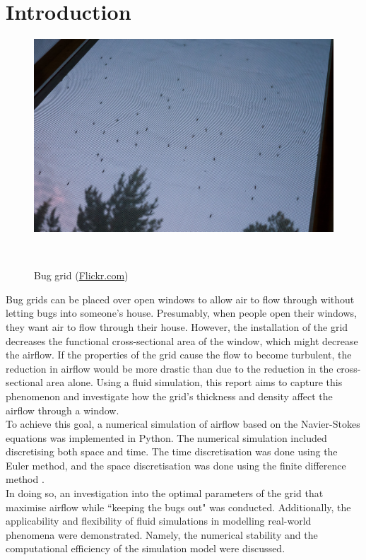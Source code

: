 \section{Introduction} \label{section: intro and motiv}

\begin{figure}
\vspace{-1.5cm}
\includegraphics[width=0.9\linewidth]{figures/mosquitogrid.jpg}
\caption{Bug grid (\href{https://www.flickr.com/photos/neekohfi/7817306994/}{Flickr.com})}\
\end{figure}

Bug grids can be placed over open windows to allow air to flow through without letting bugs into someone's house. Presumably, when people open their windows, they want air to flow through their house. However, the installation of the grid decreases the functional cross-sectional area of the window, which might decrease the airflow. If the properties of the grid cause the flow to become turbulent, the reduction in airflow would be more drastic than due to the reduction in the cross-sectional area alone. Using a fluid simulation, this report aims to capture this phenomenon and investigate how the grid's thickness and density affect the airflow through a window. \\

To achieve this goal, a numerical simulation of airflow based on the Navier-Stokes equations was implemented in Python. The numerical simulation included discretising both space and time. The time discretisation was done using the Euler method, and the space discretisation was done using the finite difference method \cite{landau2015computational}. \\ 

In doing so, an investigation into the optimal parameters of the grid that maximise airflow while ``keeping the bugs out" was conducted. Additionally, the applicability and flexibility of fluid simulations in modelling real-world phenomena were demonstrated. Namely, the numerical stability and the computational efficiency of the simulation model were discussed. \\


